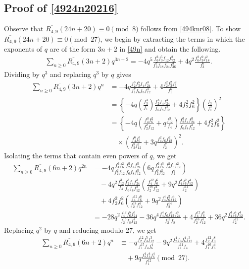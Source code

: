 \documentclass{amsart}
\theoremstyle{definition}
\begin{document}
\subsection*{Proof of \eqref{4924n20216}}
Observe that $\overline{R_{4,9}}(24n+20)\equiv0\pmod{8}$ follows from \eqref{494knr08}. To show $\overline{R_{4,9}}(24n+20)\equiv0\pmod{27}$, we begin by extracting the terms in which the exponents of $q$ are of the form ${3n+2}$ in \eqref{49n} and obtain the following. 
\begin{align*}
    \sum_{n\geq0}\overline{R_{4,9}}(3n+2)q^{3n+2}=-4q^5\frac{f_6^3f_9^5f_{12}f_{72}^3}{f_3^7f_{18}f_{24}f_{36}^3}+4q^2\frac{f_6^2f_9^2f_{18}^2}{f_3^6}.
\end{align*}
Dividing by $q^3$ and replacing $q^3$ by $q$ gives
\begin{align*}
\sum_{n\geq0}\overline{R_{4,9}}(3n+2)q^n&=-4q\frac{f_2^3f_3^5f_{4}f_{24}^3}{f_1^7f_{6}f_{8}f_{12}^3}+4\frac{f_2^2f_3^2f_6^2}{f_1^6}\\
    &=\left\{-4q\left(\frac{f_3^3}{f_1}\right)\frac{f_2^3f_4f_{24}^3}{f_6f_8f_{12}^3}+4f_2^2f_6^2\right\}\left(\frac{f_3}{f_1^3}\right)^2\\
&=\left\{-4q\left(\frac{f_4^3f_6^2}{f_2^2f_{12}}+q\frac{f_{12}^3}{f_4} \right)\frac{f_2^3f_4f_{24}^3}{f_6f_8f_{12}^3}+4f_2^2f_6^2\right\}\\
&\quad\times\left(\frac{f_4^6f_6^3}{f_2^9f_{12}^2}+3q\frac{f_4^2f_6f_{12}^2}{f_2^7}\right)^2.
\end{align*}
Isolating the terms that contain even powers of $q$, we get
\begin{align*}
    \sum_{n\geq0}\overline{R_{4,9}}(6n+2)q^{2n}&=-4q\frac{f_4^3f_6^2}{f_2^2f_{12}}\frac{f_2^3f_4f_{24}^3}{f_6f_8f_{12}^3}\left(6q\frac{f_4^6f_6^3}{f_2^9f_{12}^2}\frac{f_4^2f_6f_{12}^2}{f_2^7}\right)\\
    &\quad -4q^2\frac{f_{12}^3}{f_4}\frac{f_2^3f_4f_{24}^3}{f_6f_8f_{12}^3}\left(\frac{f_4^{12}f_6^6}{f_2^{18}f_{12}^4}+9q^2\frac{f_4^4f_6^2f_{12}^4}{f_2^{14}}\right)\\
    &\quad + 4f_2^2f_6^2\left(\frac{f_4^{12}f_6^6}{f_2^{18}f_{12}^4}+9q^2\frac{f_4^4f_6^2f_{12}^4}{f_2^{14}}\right)\\
    &=-28q^2\frac{f_4^{12}f_6^5f_{24}^3}{f_2^{15}f_8f_{12}^4}-36q^4\frac{f_4^4f_6f_{12}^4f_{24}^3}{f_2^{11}f_8}+4\frac{f_4^{12}f_6^8}{f_2^{16}f_{12}^4}+36q^2\frac{f_4^4f_6^4f_{12}^4}{f_2^{12}}.
\end{align*}
Replacing $q^2$ by $q$ and reducing modulo 27, we get 
\begin{align*}
    \sum_{n\geq0}\overline{R_{4,9}}(6n+2)q^n&\equiv-q\frac{f_2^{12}f_3^5f_{12}^3}{f_1^{15}f_4f_{6}^4}-9q^2\frac{f_2^4f_3f_{6}^4f_{12}^3}{f_1^{11}f_4}+4\frac{f_2^{12}f_3^8}{f_1^{16}f_{6}^4}\\
    &\quad+9q\frac{f_2^4f_3^4f_{6}^4}{f_1^{12}}\pmod{27}.
\end{align*}
\end{document}
